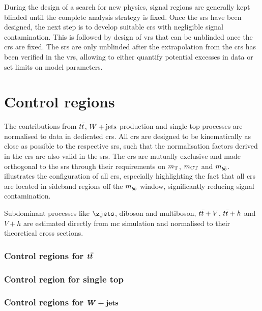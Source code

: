 During the design of a search for new physics, signal regions are generally kept blinded until the complete analysis strategy is fixed. Once the \glspl{sr} have been designed, the next step is to develop suitable \glspl{cr} with negligible signal contamination. This is followed by design of \glspl{vr} that can be unblinded once the \glspl{cr} are fixed. The \glspl{sr} are only unblinded after the extrapolation from the \glspl{cr} has been verified in the \glspl{vr}, allowing to either quantify potential excesses in data or set limits on model parameters. 

\section{Control regions}

The contributions from $\ttbar$, $\wjets$ production and single top processes are normalised to data in dedicated \glspl{cr}. All \glspl{cr} are designed to be kinematically as close as possible to the respective \glspl{sr}, such that the normalisation factors derived in the \glspl{cr} are also valid in the \glspl{sr}. The \glspl{cr} are mutually exclusive and made orthogonal to the \glspl{sr} through their requirements on $m_{\textrm{T}}$, $m_{\textrm{CT}}$ and $m_{b\bar{b}}$.  illustrates the configuration of all \glspl{cr}, especially highlighting the fact that all \glspl{cr} are located in sideband regions off the $m_{b\bar{b}}$ window, significantly reducing signal contamination.

Subdominant processes like $\zjets$, diboson and multiboson, $t\bar{t}+V$, $t\bar{t}+h$ and $V+h$ are estimated directly from \gls{mc} simulation and normalised to their theoretical cross sections. 

\subsubsection[Control regions for $\ttbar$]{Control regions for $\boldsymbol{t\bar{t}}$}



\subsubsection{Control region for single top}

\subsubsection[Control region for $\wjets$]{Control regions for $\boldsymbol{W+\mathrm{jets}}$}



